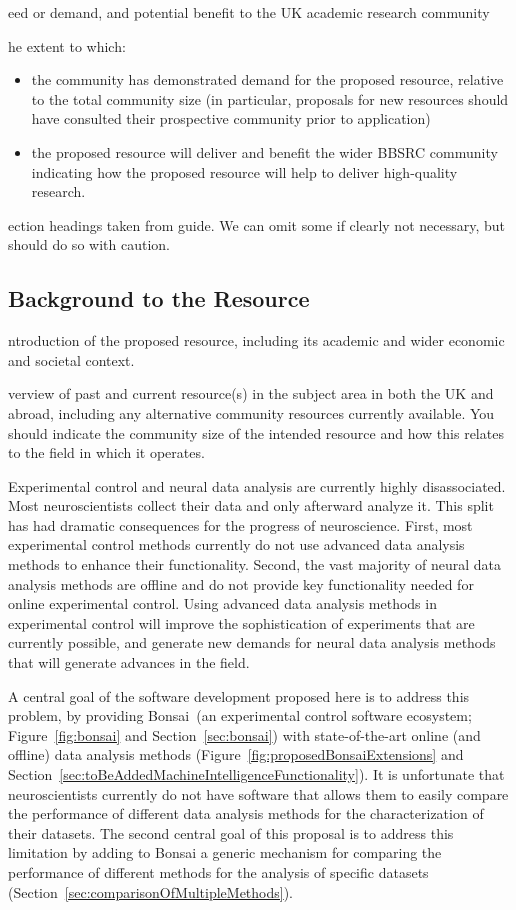 \documentclass[a4paper,11point]{article}
\def\ii#1\par{{\color{blue!40}\sl #1}\par}
\def\iibf#1\par{{\color{blue!40}\sl\bfseries #1}\par}
\begin{document}
\iibf Need or demand, and potential benefit to the UK academic research community

\ii The extent to which:
\begin{itemize}
    \item the community has demonstrated demand for the proposed resource, relative to the total community size (in particular, proposals for new resources should have consulted their prospective community prior to application)
    \item the proposed resource will deliver and benefit the wider BBSRC community indicating how the proposed resource will help to deliver high-quality research.
\end{itemize}


\newpage
\ii Section headings taken from guide.  We can omit some if clearly not necessary, but should do so with caution.


\subsection{Background to the Resource}
\ii Introduction of the proposed resource, including its academic and wider 
economic and societal context.

\ii Overview of past and current resource(s) in the subject area in both the UK 
and abroad, including any alternative community resources currently 
available. You should indicate the community size of the intended resource 
and how this relates to the field in which it operates.

Experimental control and neural data analysis are currently highly
disassociated.  Most neuroscientists collect their data and only afterward
analyze it. This split has had dramatic consequences for the progress of
neuroscience. First, most experimental control methods currently do not use
advanced data analysis methods to enhance their functionality. Second, the vast
majority of neural data analysis methods are offline and do not provide key
functionality needed for online experimental control. Using advanced data
analysis methods in experimental control will improve the sophistication of
experiments that are currently possible, and generate new demands for neural
data analysis methods that will generate advances in the field.

A central goal of the software development proposed here is to address this
problem, by providing Bonsai~(an experimental control software ecosystem;
Figure~\ref{fig:bonsai} and Section~\ref{sec:bonsai}) with state-of-the-art online (and offline) data
analysis methods (Figure~\ref{fig:proposedBonsaiExtensions} and 
Section~\ref{sec:toBeAddedMachineIntelligenceFunctionality}).
%
It is unfortunate that neuroscientists currently do not have software that
allows them to easily compare the performance of different data analysis
methods for the characterization of their datasets. The second central goal
of this proposal is to address this limitation by adding to Bonsai a generic
mechanism for comparing the performance of different methods for the analysis
of specific datasets (Section~\ref{sec:comparisonOfMultipleMethods}).
\end{document}
